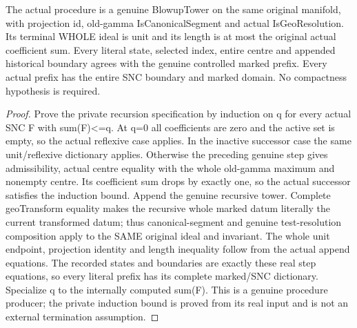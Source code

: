 \begin{theorem}
\label{hir:submersion-ordered-procedure-finite-resolution}
\leanok
The actual procedure is a genuine BlowupTower on the same original manifold,
with projection id, old-gamma IsCanonicalSegment and actual IsGeoResolution.
Its terminal WHOLE ideal is unit and its length is at most the original
actual coefficient sum. Every literal state, selected index, entire centre
and appended historical boundary agrees with the genuine controlled marked
prefix. Every actual prefix has the entire SNC boundary and marked domain.
No compactness hypothesis is required.
\end{theorem}
\begin{proof}
Prove the private recursion specification by induction on q for every
actual SNC F with sum(F)<=q. At q=0 all coefficients are zero and the
active set is empty, so the actual reflexive case applies. In the inactive
successor case the same unit/reflexive dictionary applies. Otherwise the
preceding genuine step gives admissibility, actual centre equality with
the whole old-gamma maximum and nonempty centre. Its coefficient sum drops
by exactly one, so the actual successor satisfies the induction bound.
Append the genuine recursive tower. Complete geoTransform equality makes
the recursive whole marked datum literally the current transformed datum;
thus canonical-segment and genuine test-resolution composition apply to
the SAME original ideal and invariant. The whole unit endpoint, projection
identity and length inequality follow from the actual append equations.
The recorded states and boundaries are exactly these real step equations,
so every literal prefix has its complete marked/SNC dictionary. Specialize
q to the internally computed sum(F). This is a genuine procedure producer;
the private induction bound is proved from its real input and is not an
external termination assumption.
\end{proof}

